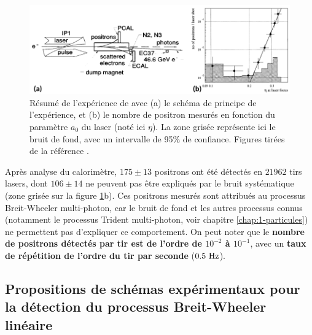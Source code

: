 \begin{refsection}
\begin{figure}[hbtp]
	\centering
	\includegraphics[width=\linewidth]{3-experience/experience_BWM.png}
	\caption{Résumé de l'expérience de \cite{burke_1997} avec (a) le schéma de principe de l'expérience, et (b) le nombre de positron mesurés en fonction du paramètre $a_0$ du laser (noté ici $\eta$). La zone grisée représente ici le bruit de fond, avec un intervalle de 95\% de confiance. Figures tirées de la référence \parencite{burke_1997}.}
	\label{fig:3-Burke}
\end{figure}

Après analyse du calorimètre, $175 \pm 13$ positrons ont été détectés en $21962$ tirs lasers, dont $106 \pm 14$ ne peuvent pas être expliqués par le bruit systématique (zone grisée sur la figure \ref{fig:3-Burke}b). Ces positrons mesurés sont attribués au processus Breit-Wheeler multi-photon, car le bruit de fond et les autres processus connus (notamment le processus Trident multi-photon, voir chapitre \ref{chap:1-particules}) ne permettent pas d'expliquer ce comportement. On peut noter que le \textbf{nombre de positrons détectés par tir est de l'ordre de $10^{-2}$ à $10^{-1}$}, avec un \textbf{taux de répétition de l'ordre du tir par seconde} ($0.5 ~ \rm Hz$).

\subsection{Propositions de schémas expérimentaux pour la détection du processus Breit-Wheeler linéaire}


\end{refsection}
